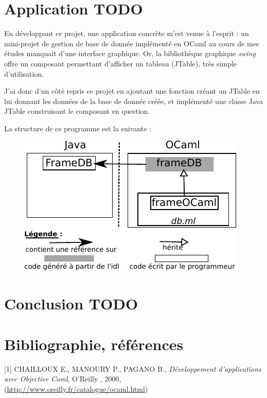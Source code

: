 \documentclass[a4paper, 11pt]{article}
\begin{document}
\section{Application TODO}

En développant ce projet, une application concrète m'est venue à l'esprit : un mini-projet de gestion de base de donnée implémenté en OCaml au cours de mes études manquait d'une interface graphique. Or, la bibliothèque graphique \emph{swing} offre un composant permettant d'afficher un tableau (JTable), très simple d'utilisation.

J'ai donc d'un côté repris ce projet en ajoutant une fonction créant un JTable en lui donnant les données de la base de donnée créée, et implémenté une classe Java JTable construisant le composant en question.

La structure de ce programme est la suivante :

\begin{figure}[h]
  \centering
  \includegraphics{exempleDB.pdf}
\end{figure}





\section*{Conclusion TODO}











\newpage
\section*{Bibliographie, références}
[1] CHAILLOUX E., MANOURY P., PAGANO B., \emph{Développement
  d'applications avec Objective Caml}, O'Reilly
, 2000, (\url{http://www.oreilly.fr/catalogue/ocaml.html})
\end{document}
